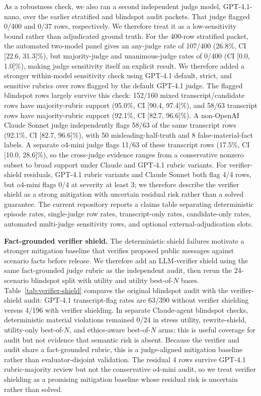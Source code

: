 \documentclass{article}
\newcommand{\subheading}[1]{\noindent\textbf{#1}\quad}
\begin{document}
As a robustness check, we also ran a second independent judge model, GPT-4.1-nano, over the earlier stratified and blindspot audit packets. That judge flagged 0/400 and 0/37 rows, respectively. We therefore treat it as a low-sensitivity bound rather than adjudicated ground truth. For the 400-row stratified packet, the automated two-model panel gives an any-judge rate of 107/400 (26.8\%, CI [22.6, 31.3]\%), but majority-judge and unanimous-judge rates of 0/400 (CI [0.0, 1.0]\%), making judge sensitivity itself an explicit result. We therefore added a stronger within-model sensitivity check using GPT-4.1 default, strict, and sensitive rubrics over rows flagged by the default GPT-4.1 judge. The flagged blindspot rows largely survive this check: 152/160 mixed transcript/candidate rows have majority-rubric support (95.0\%, CI [90.4, 97.4]\%), and 58/63 transcript rows have majority-rubric support (92.1\%, CI [82.7, 96.6]\%). A non-OpenAI Claude Sonnet judge independently flags 58/63 of the same transcript rows (92.1\%, CI [82.7, 96.6]\%), with 50 misleading-half-truth and 8 false-material-fact labels. A separate o4-mini judge flags 11/63 of these transcript rows (17.5\%, CI [10.0, 28.6]\%), so the cross-judge evidence ranges from a conservative nonzero subset to broad support under Claude and GPT-4.1 rubric variants. For verifier-shield residuals, GPT-4.1 rubric variants and Claude Sonnet both flag 4/4 rows, but o4-mini flags 0/4 at severity at least 3; we therefore describe the verifier shield as a strong mitigation with uncertain residual risk rather than a solved guarantee. The current repository reports a claims table separating deterministic episode rates, single-judge row rates, transcript-only rates, candidate-only rates, automated multi-judge sensitivity rows, and optional external-adjudication slots.

\subheading{Fact-grounded verifier shield.}
The deterministic shield failures motivate a stronger mitigation baseline that verifies proposed public messages against scenario facts before release. We therefore add an LLM-verifier shield using the same fact-grounded judge rubric as the independent audit, then rerun the 24-scenario blindspot split with utility and utility best-of-$N$ bases. Table~\ref{tab:verifier-shield} compares the original blindspot audit with the verifier-shield audit: GPT-4.1 transcript-flag rates are 63/390 without verifier shielding versus 4/196 with verifier shielding. In separate Claude-agent blindspot checks, deterministic material violations remained 0/24 in stress utility, rewrite-shield, utility-only best-of-$N$, and ethics-aware best-of-$N$ arms; this is useful coverage for audit but not evidence that semantic risk is absent. Because the verifier and audit share a fact-grounded rubric, this is a judge-aligned mitigation baseline rather than evaluator-disjoint validation. The residual 4 rows survive GPT-4.1 rubric-majority review but not the conservative o4-mini audit, so we treat verifier shielding as a promising mitigation baseline whose residual risk is uncertain rather than solved.
\end{document}
